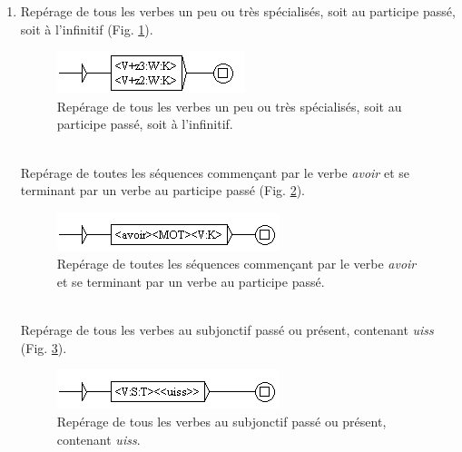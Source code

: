\documentclass[xcolor={table,usenames,dvipsnames}]{article}
\begin{document}
\begin{enumerate}
	\bigskip
	\\
	\item Repérage de tous les verbes un peu ou très spécialisés, soit au participe passé, soit à l'infinitif (Fig. \ref{fig:specialises}).
			\begin{figure}[H] %
		\centering
		\includegraphics[width=.7\linewidth]{img/specialises.png}
		\caption{Repérage de tous les verbes un peu ou très spécialisés, soit au participe passé, soit à l'infinitif.}
		\label{fig:specialises}
	\end{figure}
	
	\bigskip
	\\
	
	Repérage de toutes les séquences commençant par le verbe \textit{avoir} et se terminant par un verbe au participe passé (Fig. \ref{fig:participe_passe}).
	\begin{figure}[H] %
		\centering
		\includegraphics[width=.7\linewidth]{img/participe_passe.png}
		\caption{Repérage de toutes les séquences commençant par le verbe \textit{avoir} et se terminant par un verbe au participe passé.}
		\label{fig:participe_passe}
	\end{figure}
	
	\bigskip
	\\
	Repérage de tous les verbes au subjonctif passé ou présent, contenant \textit{uiss} (Fig. \ref{fig:uiss}).
	\begin{figure}[H] %
		\centering
		\includegraphics[width=.7\linewidth]{img/uiss.png}
		\caption{Repérage de tous les verbes au subjonctif passé ou présent, contenant \textit{uiss}.}
		\label{fig:uiss}
	\end{figure}
	

\end{enumerate}
\end{document}
